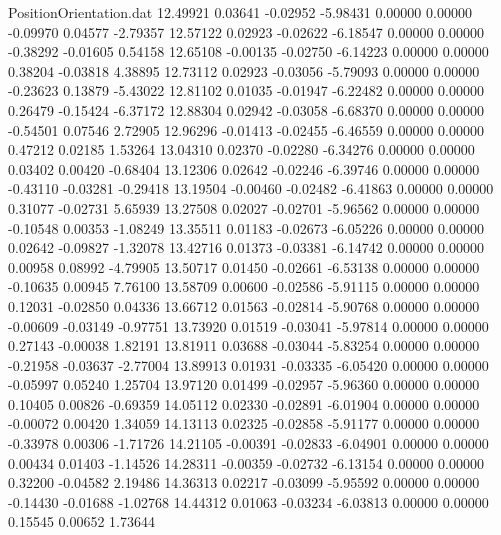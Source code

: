 \begin{filecontents}{PositionOrientation.dat}
  12.49921    0.03641   -0.02952    -5.98431    0.00000    0.00000   -0.09970    0.04577   -2.79357
  12.57122    0.02923   -0.02622    -6.18547    0.00000    0.00000   -0.38292   -0.01605    0.54158
  12.65108   -0.00135   -0.02750    -6.14223    0.00000    0.00000    0.38204   -0.03818    4.38895
  12.73112    0.02923   -0.03056    -5.79093    0.00000    0.00000   -0.23623    0.13879   -5.43022
  12.81102    0.01035   -0.01947    -6.22482    0.00000    0.00000    0.26479   -0.15424   -6.37172
  12.88304    0.02942   -0.03058    -6.68370    0.00000    0.00000   -0.54501    0.07546    2.72905
  12.96296   -0.01413   -0.02455    -6.46559    0.00000    0.00000    0.47212    0.02185    1.53264
  13.04310    0.02370   -0.02280    -6.34276    0.00000    0.00000    0.03402    0.00420   -0.68404
  13.12306    0.02642   -0.02246    -6.39746    0.00000    0.00000   -0.43110   -0.03281   -0.29418
  13.19504   -0.00460   -0.02482    -6.41863    0.00000    0.00000    0.31077   -0.02731    5.65939
  13.27508    0.02027   -0.02701    -5.96562    0.00000    0.00000   -0.10548    0.00353   -1.08249
  13.35511    0.01183   -0.02673    -6.05226    0.00000    0.00000    0.02642   -0.09827   -1.32078
  13.42716    0.01373   -0.03381    -6.14742    0.00000    0.00000    0.00958    0.08992   -4.79905
  13.50717    0.01450   -0.02661    -6.53138    0.00000    0.00000   -0.10635    0.00945    7.76100
  13.58709    0.00600   -0.02586    -5.91115    0.00000    0.00000    0.12031   -0.02850    0.04336
  13.66712    0.01563   -0.02814    -5.90768    0.00000    0.00000   -0.00609   -0.03149   -0.97751
  13.73920    0.01519   -0.03041    -5.97814    0.00000    0.00000    0.27143   -0.00038    1.82191
  13.81911    0.03688   -0.03044    -5.83254    0.00000    0.00000   -0.21958   -0.03637   -2.77004
  13.89913    0.01931   -0.03335    -6.05420    0.00000    0.00000   -0.05997    0.05240    1.25704
  13.97120    0.01499   -0.02957    -5.96360    0.00000    0.00000    0.10405    0.00826   -0.69359
  14.05112    0.02330   -0.02891    -6.01904    0.00000    0.00000   -0.00072    0.00420    1.34059
  14.13113    0.02325   -0.02858    -5.91177    0.00000    0.00000   -0.33978    0.00306   -1.71726
  14.21105   -0.00391   -0.02833    -6.04901    0.00000    0.00000    0.00434    0.01403   -1.14526
  14.28311   -0.00359   -0.02732    -6.13154    0.00000    0.00000    0.32200   -0.04582    2.19486
  14.36313    0.02217   -0.03099    -5.95592    0.00000    0.00000   -0.14430   -0.01688   -1.02768
  14.44312    0.01063   -0.03234    -6.03813    0.00000    0.00000    0.15545    0.00652    1.73644

\end{filecontents}
